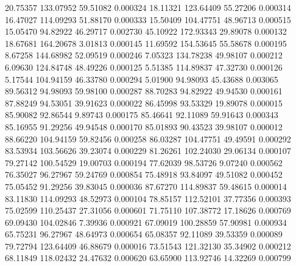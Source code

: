        20.75357      133.07952       59.51082       0.000324
       18.11321      123.64409       55.27206       0.000314
       16.47027      114.09293       51.88170       0.000333
       15.50409      104.47751       48.96713       0.000515
       15.05470       94.82922       46.29717       0.002730
       45.10922      172.93343       29.89078       0.000132
       18.67681      164.20678        3.01813       0.000145
       11.69592      154.53645       55.58678       0.000195
	8.67258      144.68982       52.09519       0.000246
	7.05323      134.78238       49.98107       0.000212
	6.09630      124.84748       48.49226       0.000125
	5.51385      114.89837       47.32730       0.000126
	5.17544      104.94159       46.33780       0.000294
	5.01900       94.98093       45.43688       0.003065
       89.56312       94.98093       59.98100       0.000287
       88.70283       94.82922       49.94530       0.000161
       87.88249       94.53051       39.91623       0.000022
       86.45998       93.53329       19.89078       0.000015
       85.90082       92.86544        9.89743       0.000175
       85.46641       92.11089       59.91643       0.000343
       85.16955       91.29256       49.94548       0.000170
       85.01893       90.43523       39.98107       0.000012
       88.66220      104.94159       59.82456       0.000258
       86.03287      104.47751       49.49591       0.000292
       83.53934      103.56626       39.23074       0.000229
       81.26261      102.24030       29.06134       0.000107
       79.27142      100.54529       19.00703       0.000194
       77.62039       98.53726        9.07240       0.000562
       76.35027       96.27967       59.24769       0.000854
       75.48918       93.84097       49.51082       0.000452
       75.05452       91.29256       39.83045       0.000036
       87.67270      114.89837       59.48615       0.000014
       83.11830      114.09293       48.52973       0.000104
       78.85157      112.52101       37.77356       0.000393
       75.02599      110.25437       27.31056       0.000601
       71.75110      107.38772       17.18626       0.000769
       69.09430      104.02846        7.39936       0.000921
       67.09019      100.28859       57.90981       0.000934
       65.75231       96.27967       48.64973       0.000654
       65.08357       92.11089       39.53359       0.000089
       79.72794      123.64409       46.88679       0.000016
       73.51543      121.32130       35.34902       0.000212
       68.11849      118.02432       24.47632       0.000620
       63.65900      113.92746       14.32269       0.000799
